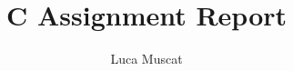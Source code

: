\documentclass[a4paper, 12pt, titlepage]{article}
\begin{document}
\title{C Assignment Report}
\author{Luca Muscat}

\titleformat{\section}{\Large\bfseries\filcenter}{}{0em}{}
\titleformat{\subsection}{\normalsize\bfseries\filcenter}{}{0em}{}
\titleformat{\subsubsection}{\small\bfseries}{}{0em}{}
\maketitle

\pagebreak
\tableofcontents
\pagebreak
\end{document}
